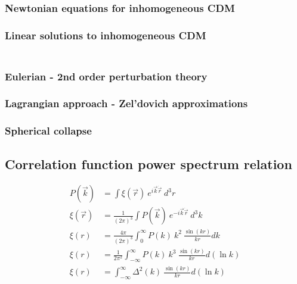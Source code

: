 \documentclass[12pt,twocolumn]{article}
\begin{document}
\subsubsection{Newtonian equations for inhomogeneous CDM}


\subsubsection{Linear solutions to inhomogeneous CDM}

\begin{align}
\end{align}

\subsubsection{Eulerian - 2nd order perturbation theory}

\subsubsection{Lagrangian approach - Zel'dovich approximations}

\subsubsection{Spherical collapse}

\subsection{Correlation function power spectrum relation}

\begin{align}
P(\vec{k}) &= \int \xi(\vec{r}) ~e^{i \vec{k} \dot \vec{r}} ~d^3r\\
\xi(\vec{r}) &= \frac{1}{(2\pi)^3} \int P(\vec{k}) ~e^{-i \vec{k} \dot \vec{r}} ~d^3 k\\
\xi(r) &= \frac{4 \pi}{(2\pi)^3} \int_{0}^{\infty} P(k) ~k^2 ~\frac{\sin(kr)}{kr} dk\\
\xi(r) &= \frac{1}{2\pi^2} \int_{-\infty}^{\infty} P(k) ~k^3 ~\frac{\sin(kr)}{kr} d(\ln k)\\
\xi(r) &= \int_{-\infty}^{\infty} \Delta^2(k) ~\frac{\sin(kr)}{kr} d(\ln k)
\end{align}

\end{document}
